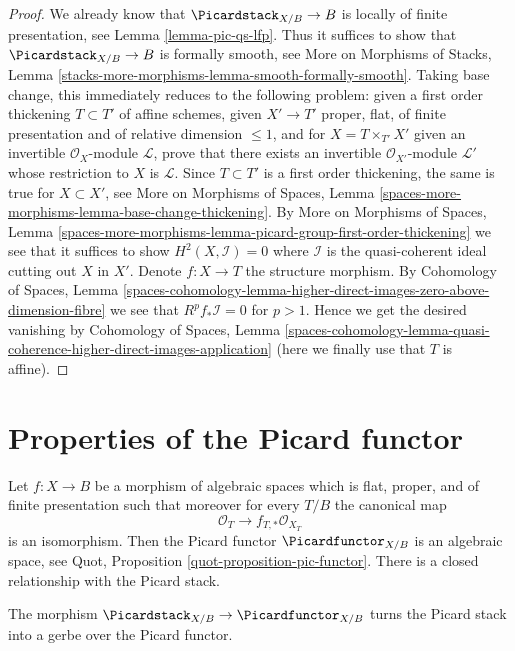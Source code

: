 \begin{proof}
We already know that $\Picardstack_{X/B} \to B$ is
locally of finite presentation, see Lemma \ref{lemma-pic-qs-lfp}.
Thus it suffices to show that $\Picardstack_{X/B} \to B$ is
formally smooth, see More on Morphisms of Stacks, Lemma
\ref{stacks-more-morphisms-lemma-smooth-formally-smooth}.
Taking base change, this immediately reduces to the following
problem: given a first order thickening $T \subset T'$
of affine schemes, given $X' \to T'$ proper, flat, of finite
presentation and of relative dimension $\leq 1$, and
for $X = T \times_{T'} X'$ given an invertible $\mathcal{O}_X$-module
$\mathcal{L}$, prove that there exists an invertible
$\mathcal{O}_{X'}$-module $\mathcal{L}'$ whose
restriction to $X$ is $\mathcal{L}$.
Since $T \subset T'$ is a first order thickening, the
same is true for $X \subset X'$, see
More on Morphisms of Spaces, Lemma
\ref{spaces-more-morphisms-lemma-base-change-thickening}.
By More on Morphisms of Spaces, Lemma
\ref{spaces-more-morphisms-lemma-picard-group-first-order-thickening}
we see that it suffices to show $H^2(X, \mathcal{I}) = 0$
where $\mathcal{I}$ is the quasi-coherent ideal cutting out $X$ in $X'$.
Denote $f : X \to T$ the structure morphism.
By Cohomology of Spaces, Lemma
\ref{spaces-cohomology-lemma-higher-direct-images-zero-above-dimension-fibre}
we see that $R^pf_*\mathcal{I} = 0$ for $p > 1$.
Hence we get the desired vanishing by
Cohomology of Spaces, Lemma
\ref{spaces-cohomology-lemma-quasi-coherence-higher-direct-images-application}
(here we finally use that $T$ is affine).
\end{proof}




\section{Properties of the Picard functor}
\label{section-picard-functor}

\noindent
Let $f : X \to B$ be a morphism of algebraic spaces which is flat,
proper, and of finite presentation such that moreover for every $T/B$
the canonical map
$$
\mathcal{O}_T \longrightarrow f_{T, *}\mathcal{O}_{X_T}
$$
is an isomorphism. Then the Picard functor $\Picardfunctor_{X/B}$ is an
algebraic space, see Quot, Proposition \ref{quot-proposition-pic-functor}.
There is a closed relationship with the Picard stack.

\begin{lemma}
\label{lemma-pic-gerbe-over-pic-functor}
The morphism $\Picardstack_{X/B} \to \Picardfunctor_{X/B}$
turns the Picard stack into a gerbe over the Picard functor.
\end{lemma}

